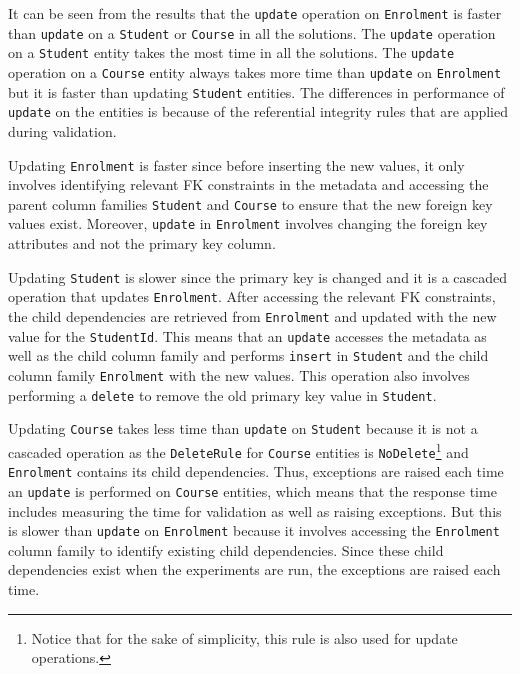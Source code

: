 It can be seen from the results that the \texttt{update} operation on
\texttt{Enrolment} is  faster than \texttt{update} on a \texttt{Student} or
\texttt{Course} in all the solutions. 
The \texttt{update} operation  on a \texttt{Student} entity takes the most time
in all the solutions. 
The \texttt{update} operation on a \texttt{Course} entity always takes more time
than \texttt{update} on \texttt{Enrolment} but it is faster than updating
\texttt{Student} entities. The differences in  performance of 
\texttt{update} on the  entities is because of the referential integrity
rules that are applied during validation. 


Updating \texttt{Enrolment} is faster since before inserting the new values,  it
only  involves  identifying relevant \ac{FK} constraints in the metadata and 
accessing the parent column families \texttt{Student} and \texttt{Course} to
ensure that the new foreign key values exist.  Moreover,  \texttt{update} in
\texttt{Enrolment} involves changing the foreign key attributes and not the
primary key column. 

Updating \texttt{Student} is slower since the primary key is changed and it is a
cascaded operation that updates \texttt{Enrolment}.  After accessing the
relevant \ac{FK} constraints,  the child dependencies are retrieved from
\texttt{Enrolment} and updated with the new value for the \texttt{StudentId}.
This means that an \texttt{update} accesses the metadata as well as the child
column family and performs \texttt{insert} in \texttt{Student} and the child
column family \texttt{Enrolment} with the new values.  This operation also
involves performing a \texttt{delete} to remove the old primary key value in
\texttt{Student}.


Updating \texttt{Course} takes less time than \texttt{update} on
\texttt{Student} because it is not a cascaded operation as the
\texttt{DeleteRule} for \texttt{Course} entities is \texttt{NoDelete}\footnote{Notice that for the
  sake of simplicity, this rule is also used for update operations.} and
\texttt{Enrolment} contains its child dependencies.  Thus,  exceptions are
raised each time an \texttt{update} is performed on \texttt{Course} entities, 
which means that the response time includes measuring the time for validation as
well as raising exceptions.  But this is slower than \texttt{update} on
\texttt{Enrolment} because it involves accessing the \texttt{Enrolment} column
family to identify existing child dependencies.  Since these child dependencies
exist when the experiments are run,  the exceptions are raised each time.

